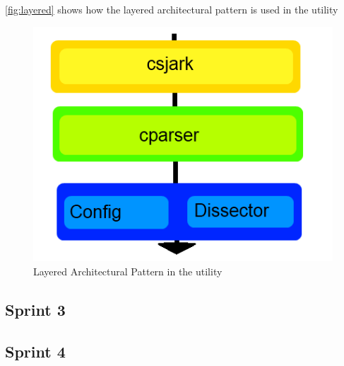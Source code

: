 \autoref{fig:layered} shows how the layered architectural pattern is used in the utility

\begin{figure}[htb]
	\includegraphics[width = \textwidth]{./planning/img/layered}
	\caption{Layered Architectural Pattern in the utility\label{fig:layered}}
\end{figure}



\subsection{Sprint 3}

\subsection{Sprint 4}


